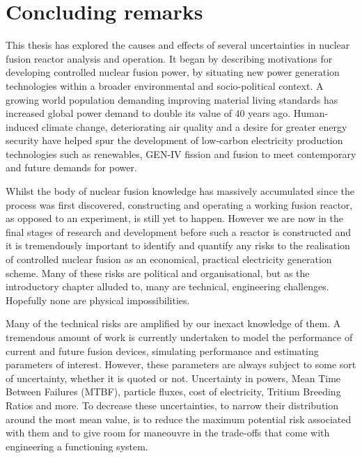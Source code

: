 
\chapter{Concluding remarks} %
\label{chap:conclusion}

\ifpdf
    \graphicspath{{Chapter4/Figs/Raster/}{Chapter4/Figs/PDF/}{Chapter4/Figs/}}
\else
    \graphicspath{{Chapter4/Figs/Vector/}{Chapter4/Figs/}}
\fi


This thesis has explored the causes and effects of several uncertainties in nuclear fusion reactor analysis and operation. It began by describing motivations for developing controlled nuclear fusion power, by situating new power generation technologies within a broader environmental and socio-political context. A growing world population demanding improving material living standards has increased global power demand to double its value of 40 years ago. Human-induced climate change, deteriorating air quality and a desire for greater energy security have helped spur the development of low-carbon electricity production technologies such as renewables, GEN-IV fission and fusion to meet contemporary and future demands for power.

Whilst the body of nuclear fusion knowledge has massively accumulated since the process was first discovered, constructing and operating a working fusion reactor, as opposed to an experiment, is still yet to happen. However we are now in the final stages of research and development before such a reactor is constructed and it is tremendously important to identify and quantify any risks to the realisation of controlled nuclear fusion as an economical, practical electricity generation scheme. Many of these risks are political and organisational, but as the introductory chapter alluded to, many are technical, engineering challenges. Hopefully none are physical impossibilities. 

Many of the technical risks are amplified by our inexact knowledge of them. A tremendous amount of work is currently undertaken to model the performance of current and future fusion devices, simulating performance and estimating parameters of interest. However, these parameters are always subject to some sort of uncertainty, whether it is quoted or not. Uncertainty in powers, Mean Time Between Failures (MTBF), particle fluxes, cost of electricity, Tritium Breeding Ratios and more. To decrease these uncertainties, to narrow their distribution around the most mean value, is to reduce the maximum potential risk associated with them and to give room for maneouvre in the trade-offs that come with engineering a functioning system. 

